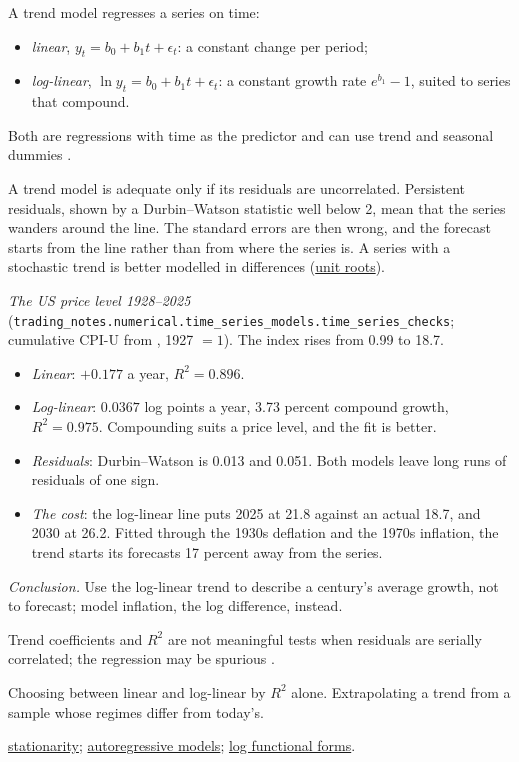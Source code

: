 \begin{qfmethod}\label{meth:trend-models}
 A trend model regresses a series on time:
\begin{itemize}
\item \emph{linear}, $y_t=b_0+b_1t+\epsilon_t$: a constant change per period;
\item \emph{log-linear}, $\ln y_t=b_0+b_1t+\epsilon_t$: a constant growth rate $e^{b_1}-1$, suited to series that compound.
\end{itemize}
Both are regressions with time as the predictor and can use trend and seasonal dummies \citep[sec.~7.4]{s7-hyndman}.

A trend model is adequate only if its residuals are uncorrelated. Persistent residuals, shown by a Durbin--Watson statistic well below 2, mean that the series wanders around the line. The standard errors are then wrong, and the forecast starts from the line rather than from where the series is. A series with a stochastic trend is better modelled in differences (\hyperref[def:stationarity-unit-roots]{unit roots}).

 \emph{The US price level 1928--2025} (\nolinkurl{trading_notes.numerical.time_series_models.time_series_checks}; cumulative CPI-U from \citep[sheet ``Returns by year'']{us-asset-returns-1928-2025}, 1927 $=1$). The index rises from 0.99 to 18.7.
\begin{itemize}
\item \emph{Linear}: $+0.177$ a year, $R^2=0.896$.
\item \emph{Log-linear}: $0.0367$ log points a year, 3.73 percent compound growth, $R^2=0.975$. Compounding suits a price level, and the fit is better.
\item \emph{Residuals}: Durbin--Watson is 0.013 and 0.051. Both models leave long runs of residuals of one sign.
\item \emph{The cost}: the log-linear line puts 2025 at 21.8 against an actual 18.7, and 2030 at 26.2. Fitted through the 1930s deflation and the 1970s inflation, the trend starts its forecasts 17 percent away from the series.
\end{itemize}
\emph{Conclusion.} Use the log-linear trend to describe a century's average growth, not to forecast; model inflation, the log difference, instead.

 Trend coefficients and $R^2$ are not meaningful tests when residuals are serially correlated; the regression may be spurious \citep[sec.~7.5]{s7-hyndman}.

 Choosing between linear and log-linear by $R^2$ alone. Extrapolating a trend from a sample whose regimes differ from today's.

 \hyperref[def:stationarity-unit-roots]{stationarity}; \hyperref[meth:autoregressive-forecasting]{autoregressive models}; \hyperref[meth:regression-prediction-functional-form]{log functional forms}.

\end{qfmethod}

